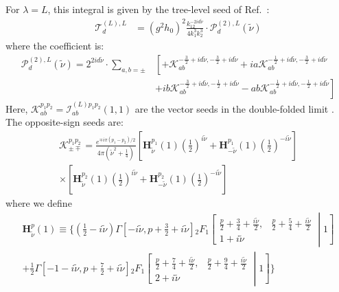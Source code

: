 \documentclass[a4paper,12pt]{article}
\newcommand{\fr}[2]{\mbox{$\frac{\,{#1}\,}{#2}$}}
\def\tn{\tilde\nu}
\begin{document}
For $\lambda=L$, this integral is given by the tree-level seed of Ref.~\cite{qin_helical_2023}:
\begin{align}
    \mathcal{T}^{(L),L}_d 
    &= \left( g^2h_0\right)^2 
    \frac{k_{12}^{-2id\tn}}{4k_1^3 k_2^3} 
    \cdot \mathcal{P}_d^{(2),L}(\tn)
\end{align}
where the coefficient is:
\begin{align}
    \mathcal{P}_d^{(2),L}(\tn)
    = 2^{2id\tn} \cdot \sum_{a,b=\pm}
    &\left[ +{\mathcal{K}}_{ab}^{-\fr32+id\tn,-\fr32+id\tn}
    + ia {\mathcal{K}}_{ab}^{-\fr12+id\tn,-\fr32+id\tn} \right. \nonumber \\
    &\left. +ib {\mathcal{K}}_{ab}^{-\fr32+id\tn,-\fr12+id\tn}
    - ab {\mathcal{K}}_{ab}^{-\fr12+id\tn,-\fr12+id\tn} \right]
\end{align}
Here, $\mathcal{K}_{ab}^{p_1p_2} = \mathcal{I}^{(L)p_1p_2}_{ab}(1,1)$ are the vector seeds in the double-folded limit \cite{qin_helical_2023}. The opposite-sign seeds are:
\begin{align}
    \mathcal{K}_{\pm\mp}^{p_1p_2} = \frac{e^{\mp i\pi(p_1-p_2)/2}}{4\pi(\tilde{\nu}^2 + \frac{1}{4})} \left[ \mathbf{H}_{\tilde{\nu}}^{p_1}(1) \left(\frac{1}{2}\right)^{i\tilde{\nu}} + \mathbf{H}_{-\tilde{\nu}}^{p_1}(1) \left(\frac{1}{2}\right)^{-i\tilde{\nu}} \right] \nonumber \\
    \times \left[ \mathbf{H}_{\tilde{\nu}}^{p_2}(1) \left(\frac{1}{2}\right)^{i\tilde{\nu}} + \mathbf{H}_{-\tilde{\nu}}^{p_2}(1) \left(\frac{1}{2}\right)^{-i\tilde{\nu}} \right]
\end{align}
where we define
\begin{align}
    \mathbf{H}_{\tilde{\nu}}^p(1) \equiv \Bigg\{ \left( \frac{1}{2} - i\tilde{\nu} \right) \Gamma\left[ -i\tilde{\nu}, p + \frac{3}{2} + i\tilde{\nu} \right] {}_2F_1\left[ \begin{matrix} \frac{p}{2} + \frac{3}{4} + \frac{i\tilde{\nu}}{2}, & \frac{p}{2} + \frac{5}{4} + \frac{i\tilde{\nu}}{2} \\ 1 + i\tilde{\nu} \end{matrix} \middle| 1 \right] \nonumber \\
    + \frac{1}{2} \Gamma\left[ -1 - i\tilde{\nu}, p + \frac{7}{2} + i\tilde{\nu} \right] {}_2F_1\left[ \begin{matrix} \frac{p}{2} + \frac{7}{4} + \frac{i\tilde{\nu}}{2}, & \frac{p}{2} + \frac{9}{4} + \frac{i\tilde{\nu}}{2} \\ 2 + i\tilde{\nu} \end{matrix} \middle| 1 \right] \Bigg\}
\end{align}
\end{document}
